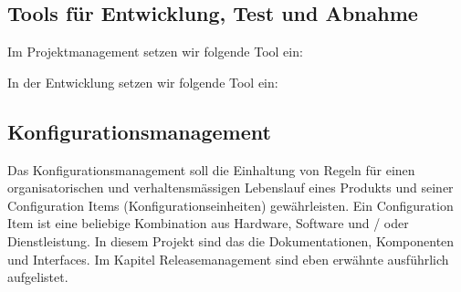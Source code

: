 \documentclass[11pt]{article}
\begin{document}
\subsection{Tools für Entwicklung, Test und Abnahme}
Im Projektmanagement setzen wir folgende Tool ein:
\begin{table}[!h]
\end{table} 
In der Entwicklung setzen wir folgende Tool ein:
\begin{table}[!h]
\end{table}
\newpage
\subsection{Konfigurationsmanagement}
Das Konfigurationsmanagement soll die Einhaltung von Regeln für einen organisatorischen und verhaltensmässigen Lebenslauf eines Produkts und seiner Configuration Items (Konfigurationseinheiten) gewährleisten.
Ein Configuration Item ist eine beliebige Kombination aus Hardware, Software und / oder Dienstleistung. In diesem Projekt sind das die Dokumentationen, Komponenten und Interfaces. Im Kapitel Releasemanagement sind eben erwähnte ausführlich aufgelistet.
\end{document}
